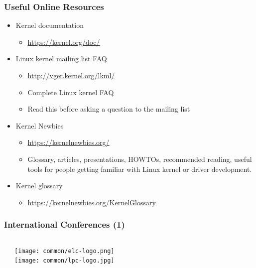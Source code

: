 \begin{frame}
  \frametitle{Useful Online Resources}
  \begin{itemize}
  \item Kernel documentation
    \begin{itemize}
    \item \url{https://kernel.org/doc/}
    \end{itemize}
  \item Linux kernel mailing list FAQ
    \begin{itemize}
    \item \url{http://vger.kernel.org/lkml/}
    \item Complete Linux kernel FAQ
    \item Read this before asking a question to the mailing list
    \end{itemize}
  \item Kernel Newbies
    \begin{itemize}
    \item \url{https://kernelnewbies.org/}
    \item Glossary, articles, presentations, HOWTOs, recommended
      reading, useful tools for people getting familiar with Linux
      kernel or driver development.
    \end{itemize}
  \item Kernel glossary
    \begin{itemize}
    \item \url{https://kernelnewbies.org/KernelGlossary}
    \end{itemize}
\end{itemize}

\end{frame}

\begin{frame}
  \frametitle{International Conferences (1)}
  \begin{columns}
  \begin{itemize}
    
    
  \end{itemize}
     \texttt{[image: common/elc-logo.png]}\\
     \vspace{1cm}
     \texttt{[image: common/lpc-logo.jpg]}\\
  \end{columns}
\end{frame}

